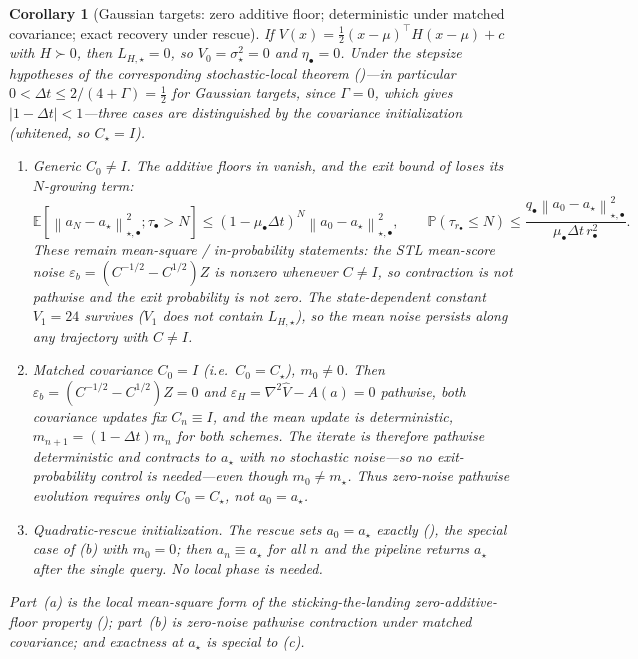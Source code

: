 \documentclass[11pt]{article}
\theoremstyle{plain}
\newtheorem{corollary}[corollary]{Corollary}
\theoremstyle{definition}
\theoremstyle{remark}
\newcommand{\E}{\mathbb{E}}
\newcommand{\Prob}{\mathbb{P}}
\newcommand{\Id}{I}
\newcommand{\norm}[1]{\left\lVert #1\right\rVert}
\newcommand{\LHs}{L_{H,\star}}
\begin{document}
\begin{corollary}[Gaussian targets: zero additive floor; deterministic under matched covariance; exact recovery under rescue]
\label{cor:stoch-local-gauss}
If $V(x)=\tfrac12(x-\mu)^\top H(x-\mu)+c$ with $H\succ0$, then $\LHs=0$, so $V_0=\sigma_\star^2=0$ and
$\eta_\bullet=0$. Under the stepsize hypotheses of the corresponding stochastic-local theorem
()---in particular $0<\Delta t\leq2/(4+\Gamma)=\tfrac12$
for Gaussian targets, since $\Gamma=0$, which gives $|1-\Delta t|<1$---three cases are distinguished by
the covariance initialization (whitened, so $C_\star=\Id$).
\begin{enumerate}
\item[(a)] \emph{Generic $C_0\neq\Id$.} The \emph{additive} floors in
 vanish, and the exit bound of
 loses its $N$-growing term:
\[
    \E[\norm{a_N-a_\star}_{\star,\bullet}^2;\tau_\bullet>N]\leq(1-\mu_\bullet\Delta t)^N\norm{a_0-a_\star}_{\star,\bullet}^2,
    \qquad
    \Prob(\tau_{r_\bullet}\leq N)\leq\frac{q_\bullet\norm{a_0-a_\star}_{\star,\bullet}^2}{\mu_\bullet\Delta t\,r_\bullet^2}.
\]
These remain mean-square / in-probability statements: the STL mean-score noise
$\varepsilon_b=(C^{-1/2}-C^{1/2})Z$ is nonzero whenever $C\neq\Id$, so contraction is \emph{not}
pathwise and the exit probability is \emph{not} zero. The state-dependent constant $V_1=24$ survives
($V_1$ does not contain $\LHs$), so the mean noise persists along any trajectory with $C\neq\Id$.
\item[(b)] \emph{Matched covariance $C_0=\Id$ (i.e.\ $C_0=C_\star$), $m_0\neq0$.} Then
$\varepsilon_b=(C^{-1/2}-C^{1/2})Z=0$ and $\varepsilon_H=\nabla^2\widehat V-A(a)=0$ pathwise, both
covariance updates fix $C_n\equiv\Id$, and the mean update is \emph{deterministic},
$m_{n+1}=(1-\Delta t)m_n$ for both schemes. The iterate is therefore pathwise deterministic and
contracts to $a_\star$ with no stochastic noise---so no exit-probability control is needed---even
though $m_0\neq m_\star$. Thus zero-noise pathwise evolution requires only $C_0=C_\star$, not
$a_0=a_\star$.
\item[(c)] \emph{Quadratic-rescue initialization.} The rescue sets $a_0=a_\star$ exactly
(), the special case of (b) with $m_0=0$; then $a_n\equiv a_\star$ for all $n$
and the pipeline returns $a_\star$ after the single query. No local phase is needed.
\end{enumerate}
Part~(a) is the local mean-square form of the sticking-the-landing zero-\emph{additive}-floor property
(); part~(b) is zero-noise pathwise contraction under matched covariance; and
exactness at $a_\star$ is special to (c).
\end{corollary}
\end{document}
